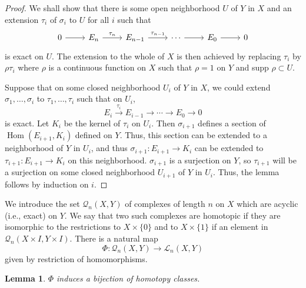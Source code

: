 \documentclass[leqno]{book}
\numberwithin{equation}{section}
\newtheorem{lemma}[theorem]{Lemma}
\theoremstyle{definition}
\begin{document}
            \begin{proof}
              We shall show that there is some open neighborhood $U$ of $Y$ in $X$ and an extension $\tau_{i}$ of $\sigma_{i}$ to $U$ for all $i$ such that
              \begin{equation*}
                \begin{tikzcd}
                  0\arrow[r] & E_{n}\arrow[r, "\tau_{n}"] & E_{n-1}\arrow[r, "\tau_{n-1}"] & \cdots \arrow[r] & E_0 \arrow[r] &0
                \end{tikzcd}
              \end{equation*}
              is exact on $U$. The extension to the whole of $X$ is then achieved by replacing $\tau_{i}$ by $\rho \tau_{i}$ where $\rho$ is a continuous function on $X$ such that $\rho=1$ on $Y$ and supp $\rho \subset U$.

              Suppose that on some closed neighborhood $U_{i}$ of $Y$ in $X$, we could extend $\sigma_{1}, \ldots ,\sigma_{i}$ to $\tau_1, \ldots ,\tau_{i}$ such that on $U_{i}$,
              \begin{equation*}
                E_{i}\stackrel{\tau_{i}}{\rightarrow} E_{i-1}\to \cdots\to E_0\to 0
              \end{equation*}
              is exact. Let $K_{i}$ be the kernel of $\tau_{i}$ on $U_{i}$. Then $\sigma_{i+1}$ defines a section of $\operatorname{Hom}(E_{i+1},K_{i})$ defined on $Y$. Thus, this section can be extended to a neighborhood of $Y$ in $U_{i}$, and thus $\sigma _{i+1}:E_{i+1}\to K_{i}$ can be extended to $\tau_{i+1}:E_{i+1}\to K_{i}$ on this neighborhood. $\sigma_{i+1}$ is a surjection on $Y$, so $\tau_{i+1}$ will be a surjection on some closed neighborhood $U_{i+1}$ of $Y$ in $U_{i}$. Thus, the lemma follows by induction on $i$.
            \end{proof}

            We introduce the set $\mathcal{Q}_{n}(X,Y)$ of complexes of length $n$ on $X$ which are acyclic (i.e., exact) on $Y$. We say that two such complexes are homotopic if they are isomorphic to the restrictions to $X\times \{0\}$ and to $X\times \{1\}$ if an element in $\mathcal{Q}_{n}(X\times I,Y\times I)$. There is a natural map
            \begin{equation*}
              \Phi:\mathcal{Q}_{n}(X,Y)\to \mathcal{L}_{n}(X,Y)
            \end{equation*}
            given by restriction of homomorphisms.

            \begin{lemma}
              $\Phi$ induces a bijection of homotopy classes.
            \end{lemma}
\end{document}
